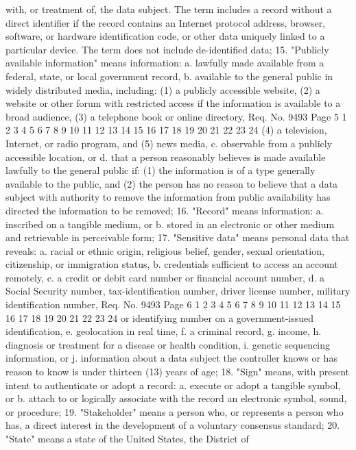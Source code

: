 with, or treatment of, the data subject. The term includes a record
without a direct identifier if the record contains an Internet
protocol address, browser, software, or hardware identification
code, or other data uniquely linked to a particular device. The
term does not include de-identified data;
15. "Publicly available information" means information:
a. lawfully made available from a federal, state, or
local government record,
b. available to the general public in widely distributed
media, including:
(1) a publicly accessible website,
(2) a website or other forum with restricted access
if the information is available to a broad
audience,
(3) a telephone book or online directory,
Req. No. 9493 Page 5
1
2
3
4
5
6
7
8
9
10
11
12
13
14
15
16
17
18
19
20
21
22
23
24
(4) a television, Internet, or radio program, and
(5) news media,
c. observable from a publicly accessible location, or
d. that a person reasonably believes is made available
lawfully to the general public if:
(1) the information is of a type generally available
to the public, and
(2) the person has no reason to believe that a data
subject with authority to remove the information
from public availability has directed the
information to be removed;
16. "Record" means information:
a. inscribed on a tangible medium, or
b. stored in an electronic or other medium and
retrievable in perceivable form;
17. "Sensitive data" means personal data that reveals:
a. racial or ethnic origin, religious belief, gender,
sexual orientation, citizenship, or immigration
status,
b. credentials sufficient to access an account remotely,
c. a credit or debit card number or financial account
number,
d. a Social Security number, tax-identification number,
driver license number, military identification number, 
Req. No. 9493 Page 6
1
2
3
4
5
6
7
8
9
10
11
12
13
14
15
16
17
18
19
20
21
22
23
24
or identifying number on a government-issued
identification,
e. geolocation in real time,
f. a criminal record,
g. income,
h. diagnosis or treatment for a disease or health
condition,
i. genetic sequencing information, or
j. information about a data subject the controller knows
or has reason to know is under thirteen (13) years of
age;
18. "Sign" means, with present intent to authenticate or adopt
a record:
a. execute or adopt a tangible symbol, or
b. attach to or logically associate with the record an
electronic symbol, sound, or procedure;
19. "Stakeholder" means a person who, or represents a person
who has, a direct interest in the development of a voluntary
consensus standard;
20. "State" means a state of the United States, the District of
